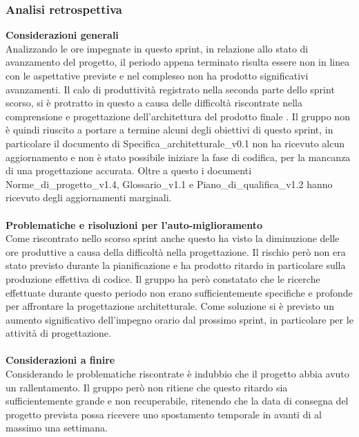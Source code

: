 \subsubsection{Analisi retrospettiva}
\textbf{Considerazioni generali}\\
Analizzando le ore impegnate in questo sprint, in relazione allo stato di avanzamento del progetto, il periodo appena terminato risulta essere non in linea con le aspettative previste e nel complesso non ha prodotto significativi avanzamenti. Il calo di produttività registrato nella seconda parte dello sprint scorso, si è protratto in questo a causa delle difficoltà riscontrate nella comprensione e progettazione dell'architettura del prodotto finale . Il gruppo non è quindi riuscito a portare a termine alcuni degli obiettivi di questo sprint, in particolare il documento di Specifica\_architetturale\_v0.1 non ha ricevuto alcun aggiornamento e non è stato possibile iniziare la fase di codifica, per la mancanza di una progettazione accurata. Oltre a questo i documenti Norme\_di\_progetto\_v1.4, Glossario\_v1.1 e Piano\_di\_qualifica\_v1.2 hanno ricevuto degli aggiornamenti marginali. \\ \\
\textbf{Problematiche e risoluzioni per l'auto-miglioramento}\\
Come riscontrato nello scorso sprint anche questo ha visto la diminuzione delle ore produttive a causa della difficoltà nella progettazione. Il rischio però non era stato previsto durante la pianificazione e ha prodotto ritardo in particolare sulla produzione effettiva di codice. Il gruppo ha però constatato che le ricerche effettuate durante questo periodo non erano sufficientemente specifiche e profonde per affrontare la progettazione architetturale. Come soluzione si è previsto un aumento significativo dell'impegno orario dal prossimo sprint, in particolare per le attività di progettazione.\\ \\
\textbf{Considerazioni a finire}\\
Considerando le problematiche riscontrate è indubbio che il progetto abbia avuto un rallentamento. Il gruppo però non ritiene che questo ritardo sia sufficientemente grande e non recuperabile, ritenendo che la data di consegna del progetto prevista possa ricevere uno spostamento temporale in avanti di al massimo una settimana.